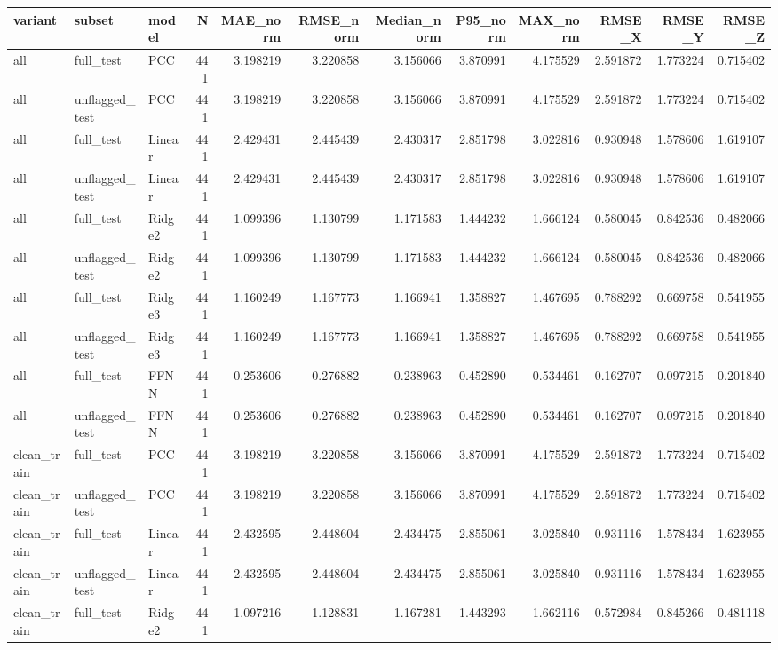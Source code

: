 \begin{tabular}{lllrrrrrrrrr}
\toprule
variant & subset & model & N & MAE_norm & RMSE_norm & Median_norm & P95_norm & MAX_norm & RMSE_X & RMSE_Y & RMSE_Z \\
\midrule
all & full_test & PCC & 441 & 3.198219 & 3.220858 & 3.156066 & 3.870991 & 4.175529 & 2.591872 & 1.773224 & 0.715402 \\
all & unflagged_test & PCC & 441 & 3.198219 & 3.220858 & 3.156066 & 3.870991 & 4.175529 & 2.591872 & 1.773224 & 0.715402 \\
all & full_test & Linear & 441 & 2.429431 & 2.445439 & 2.430317 & 2.851798 & 3.022816 & 0.930948 & 1.578606 & 1.619107 \\
all & unflagged_test & Linear & 441 & 2.429431 & 2.445439 & 2.430317 & 2.851798 & 3.022816 & 0.930948 & 1.578606 & 1.619107 \\
all & full_test & Ridge2 & 441 & 1.099396 & 1.130799 & 1.171583 & 1.444232 & 1.666124 & 0.580045 & 0.842536 & 0.482066 \\
all & unflagged_test & Ridge2 & 441 & 1.099396 & 1.130799 & 1.171583 & 1.444232 & 1.666124 & 0.580045 & 0.842536 & 0.482066 \\
all & full_test & Ridge3 & 441 & 1.160249 & 1.167773 & 1.166941 & 1.358827 & 1.467695 & 0.788292 & 0.669758 & 0.541955 \\
all & unflagged_test & Ridge3 & 441 & 1.160249 & 1.167773 & 1.166941 & 1.358827 & 1.467695 & 0.788292 & 0.669758 & 0.541955 \\
all & full_test & FFNN & 441 & 0.253606 & 0.276882 & 0.238963 & 0.452890 & 0.534461 & 0.162707 & 0.097215 & 0.201840 \\
all & unflagged_test & FFNN & 441 & 0.253606 & 0.276882 & 0.238963 & 0.452890 & 0.534461 & 0.162707 & 0.097215 & 0.201840 \\
clean_train & full_test & PCC & 441 & 3.198219 & 3.220858 & 3.156066 & 3.870991 & 4.175529 & 2.591872 & 1.773224 & 0.715402 \\
clean_train & unflagged_test & PCC & 441 & 3.198219 & 3.220858 & 3.156066 & 3.870991 & 4.175529 & 2.591872 & 1.773224 & 0.715402 \\
clean_train & full_test & Linear & 441 & 2.432595 & 2.448604 & 2.434475 & 2.855061 & 3.025840 & 0.931116 & 1.578434 & 1.623955 \\
clean_train & unflagged_test & Linear & 441 & 2.432595 & 2.448604 & 2.434475 & 2.855061 & 3.025840 & 0.931116 & 1.578434 & 1.623955 \\
clean_train & full_test & Ridge2 & 441 & 1.097216 & 1.128831 & 1.167281 & 1.443293 & 1.662116 & 0.572984 & 0.845266 & 0.481118 \\

\end{tabular}
